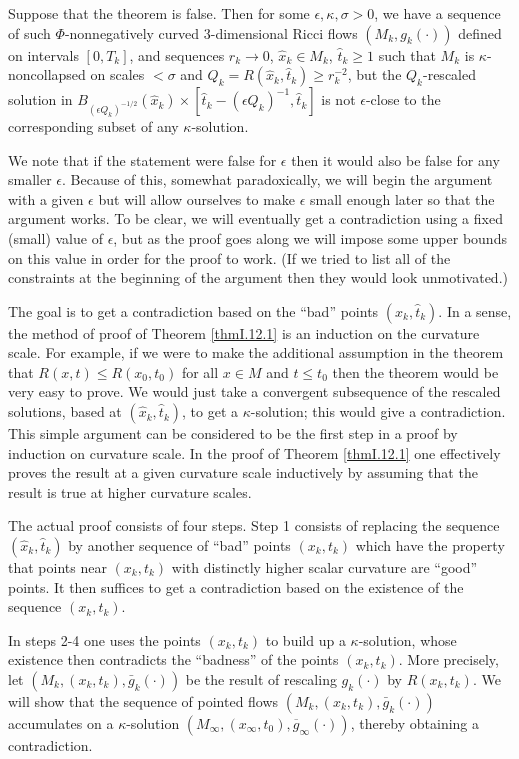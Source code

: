 Suppose that the theorem is false.  Then for some $\epsilon, \kappa,\sigma>0$,
we have a sequence of such $\Phi$-nonnegatively curved
$3$-dimensional Ricci flows $(M_k,g_k(\cdot))$
defined on intervals $[0,T_k]$,
and sequences $r_k \rightarrow 0$, $\hat{x}_k\in M_k$, $\hat{t}_k\geq 1$ such
that $M_k$ is $\kappa$-noncollapsed on scales $< \sigma$ and
$Q_k = R(\hat{x}_k,\hat{t}_k) \ge r_k^{-2}$, but the $Q_k$-rescaled solution
in $B_{(\epsilon Q_k)^{-1/2}}(\hat{x}_k) \times
[\hat{t}_k - (\epsilon Q_k)^{-1}, \hat{t}_k]$ is not $\epsilon$-close to the
corresponding subset of any $\kappa$-solution.

We note that if the statement were false for $\epsilon$ then it would
also be false for any smaller $\epsilon$. Because of
this, somewhat paradoxically, we will begin the argument with a
given $\epsilon$ but will allow ourselves to make $\epsilon$ small
enough later so that the argument works.
To be clear, we will eventually get a contradiction using a fixed
(small) value of $\epsilon$, but as the proof goes along we will
impose some upper bounds on this value in order for the proof to work.
(If we tried to list all of
the constraints at the beginning of the argument then they would
look unmotivated.)

The goal is to get a contradiction based on the ``bad'' points
$(\widehat{x}_k, \widehat{t}_k)$.
In a sense, the method of proof of Theorem \ref{thmI.12.1} is an induction on
the curvature scale. For example, if we were to make the additional
assumption in the theorem
 that $R(x, t) \le R(x_0, t_0)$ for all $x \in M$ and $t \le t_0$
then the theorem would be very easy to prove. We would just take
a convergent subsequence of the rescaled solutions, based at
$(\hat{x}_k, \hat{t}_k)$, to get a $\kappa$-solution; this would
give a contradiction. This simple argument
can be considered to be the first step
in a proof by induction on curvature scale. In the proof of
Theorem \ref{thmI.12.1} one effectively proves the result at a
given curvature scale inductively by assuming that the result
is true at higher curvature scales.

The actual proof consists of four steps.
Step 1 consists of replacing the sequence $(\widehat{x}_k, \widehat{t}_k)$
by another sequence of ``bad'' points $(x_k, t_k)$ which have the
property that points near
$(x_k, t_k)$ with distinctly higher scalar curvature are ``good'' points.
It then suffices to get a contradiction based on the existence of the
sequence $(x_k, t_k)$.

In steps 2-4 one uses the points $(x_k, t_k)$
to build up a $\kappa$-solution, whose existence then contradicts the
``badness'' of the points $(x_k, t_k)$.
More precisely, let
$(M_k,(x_k,t_k),\bar g_k(\cdot))$ be the result of rescaling $g_k(\cdot)$
by $R(x_k,t_k)$.
We will show that the sequence of pointed
flows $(M_k,(x_k,t_k),\bar g_k(\cdot))$ accumulates on a $\kappa$-solution
$(M_\infty, (x_\infty, t_0), \overline{g}_\infty(\cdot))$,
thereby obtaining a contradiction.

